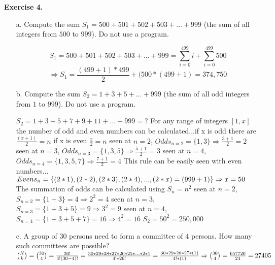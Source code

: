 \documentclass[12pt,letterpaper,final]{report}
\begin{document}
\textbf{Exercise 4.}
\begin{enumerate}
\item[a.] Compute the sum $S_1 = 500 + 501+ 502 + 503 + \ldots + 999$ (the sum of all integers from $500$ to $999$). Do not use a program.
    
    \[ S_1 = 500 + 501+ 502 + 503 + \ldots + 999 = \sum_{i=0}^{499} i +\sum_{i=0}^{499} 500\]\[ \Rightarrow
     S_1 = \frac{(499+1)*499}{2} + (500*(499+1)  = 374,750\]
    
\item[b.] Compute the sum $S_2 = 1 + 3 + 5 + \ldots + 999$  (the sum of all odd integers from $1$ to $999$).   Do not use a program.
 
    $S_2 = 1+3+5+7+9+11+...+999 = ?$ 
    \newline For any range of integers $[1, x]$ the number of odd and even numbers can be calculated...\medskip\newline if x is odd there are $\frac{(x+1)}{2}=n$ \newline if x is even $\frac{x}{2}=n$ 
    \medskip\newline seen at $n=2$, $Odds_{n=2} =\{1,3\}  \Rightarrow \frac{3+1}{2}=2$ 
    \newline seen at $n=3$, $Odds_{n=3} =\{1,3,5\} \Rightarrow \frac{5+1}{2}=3$
    \newline seen at $n=4$, $Odds_{n=4} =\{1,3,5,7\} \Rightarrow \frac{7+1}{2}=4$
    \pagebreak 
    \newline This rule can be easily seen with even numbers...\newline $Evens_{n}= \{(2*1),(2*2),(2*3),(2*4) ,...,(2*x)=(999+1) \} \newline\Rightarrow x=50$
    \medskip\newline The summation of odds can be calculated using $S_{n} = n^2$
    \newline seen at $n=2$, $S_{n=2} =\{1+3\}=4  \Rightarrow 2^2=4$
    \newline seen at $n=3$, $S_{n=3} =\{1+3+5\}=9 \Rightarrow 3^2=9$
    \newline seen at $n=4$, $S_{n=4} =\{1+3+5+7\}= 16 \Rightarrow 4^2=16$
    \medskip\newline $S_2 = 50^2 = 250,000$
    

\item[c.] A group of $30$ persons need to form a committee of $4$ persons. How many such committees are possible?
$\bigskip\newline  \binom{N}{k} = \binom{30}{4} = \frac{30!}{4!(30-4)!} = \frac{30*29*28*27*26*25*...*2*1}{4!*26!} = \frac{30*29*28*27*(1)}{4! *(1)} \Rightarrow\newline\newline \binom{30}{4} = \frac{657720}{24} = 27405$




\end{enumerate}
\end{document}
